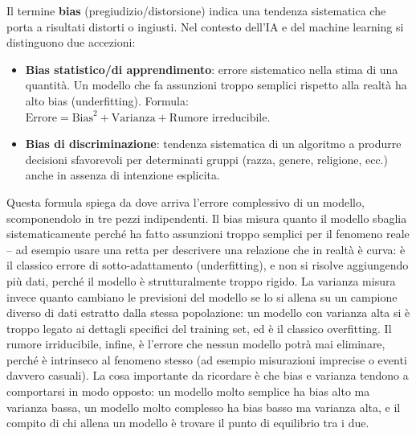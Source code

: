 \documentclass[a4paper,11pt]{article}
\begin{document}
\begin{definizione}
Il termine \textbf{bias} (pregiudizio/distorsione) indica una tendenza sistematica che porta a risultati distorti o ingiusti. Nel contesto dell'IA e del machine learning si distinguono due accezioni:
\begin{itemize}
  \item \textbf{Bias statistico/di apprendimento}: errore sistematico nella stima di una quantità. Un modello che fa assunzioni troppo semplici rispetto alla realtà ha alto bias (underfitting). Formula: $\text{Errore} = \text{Bias}^2 + \text{Varianza} + \text{Rumore irreducibile}$.
  \item \textbf{Bias di discriminazione}: tendenza sistematica di un algoritmo a produrre decisioni sfavorevoli per determinati gruppi (razza, genere, religione, ecc.) anche in assenza di intenzione esplicita.
\end{itemize}

\begin{nota}
Questa formula spiega da dove arriva l'errore complessivo di un modello, scomponendolo in tre pezzi indipendenti. Il bias misura quanto il modello sbaglia sistematicamente perché ha fatto assunzioni troppo semplici per il fenomeno reale -- ad esempio usare una retta per descrivere una relazione che in realtà è curva: è il classico errore di sotto-adattamento (underfitting), e non si risolve aggiungendo più dati, perché il modello è strutturalmente troppo rigido. La varianza misura invece quanto cambiano le previsioni del modello se lo si allena su un campione diverso di dati estratto dalla stessa popolazione: un modello con varianza alta si è troppo legato ai dettagli specifici del training set, ed è il classico overfitting. Il rumore irriducibile, infine, è l'errore che nessun modello potrà mai eliminare, perché è intrinseco al fenomeno stesso (ad esempio misurazioni imprecise o eventi davvero casuali). La cosa importante da ricordare è che bias e varianza tendono a comportarsi in modo opposto: un modello molto semplice ha bias alto ma varianza bassa, un modello molto complesso ha bias basso ma varianza alta, e il compito di chi allena un modello è trovare il punto di equilibrio tra i due.
\end{nota}


\end{definizione}
\end{document}
